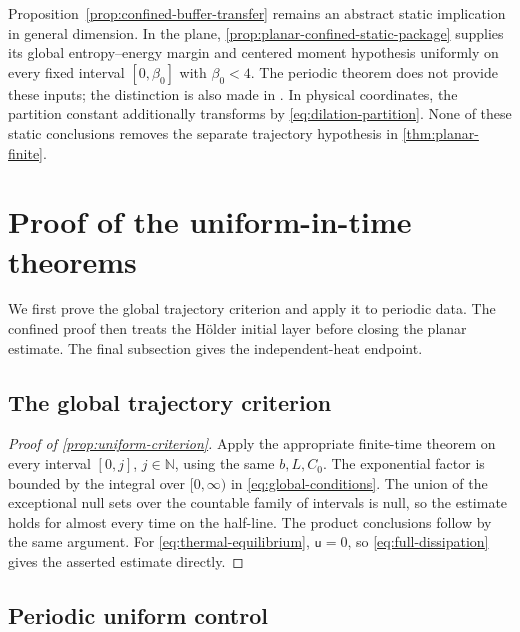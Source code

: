 \documentclass[11pt,reqno]{amsart}
\numberwithin{equation}{section}
\theoremstyle{definition}
\theoremstyle{remark}
\newcommand{\N}{\mathbb N}
\renewcommand{\u}{\mathsf u}
\newcommand{\revision}[1]{{\ifdefined\MarkedRevision\color{red}\fi#1}}
\begin{document}
Proposition~\ref{prop:confined-buffer-transfer} remains an abstract static implication in general dimension. In the plane, \cref{prop:planar-confined-static-package} supplies its global entropy--energy margin and centered moment hypothesis uniformly on every fixed interval $[0,\beta_0]$ with $\beta_0<4$. The periodic theorem does not provide these inputs; the distinction is also made in \cite[Section~10.6]{PartI}. In physical coordinates, the partition constant additionally transforms by \eqref{eq:dilation-partition}. None of these static conclusions removes the separate trajectory hypothesis in \cref{thm:planar-finite}.
\endgroup

\section{Proof of the uniform-in-time theorems}\label{sec:uniform-proofs}

\revision{We first prove the global trajectory criterion and apply it to periodic data. The confined proof then treats the H\"older initial layer before closing the planar estimate. The final subsection gives the independent-heat endpoint.}

\subsection{\texorpdfstring{\revision{The global trajectory criterion}}{The global trajectory criterion}}\label{subsec:global-criterion-proof}

\begin{proof}[Proof of \cref{prop:uniform-criterion}]
Apply the appropriate finite-time theorem on every interval $[0,j]$, $j\in\N$, using the same $b,L,C_0$. The exponential factor is bounded by the integral over $[0,\infty)$ in \eqref{eq:global-conditions}. The union of the exceptional null sets over the countable family of intervals is null, so the estimate holds for almost every time on the half-line. The product conclusions follow by the same argument. For \eqref{eq:thermal-equilibrium}, $\u=0$, so \eqref{eq:full-dissipation} gives the asserted estimate directly.
\end{proof}

\subsection{\texorpdfstring{\revision{Periodic uniform control}}{Periodic uniform control}}\label{subsec:periodic-uniform-proof}
\end{document}
